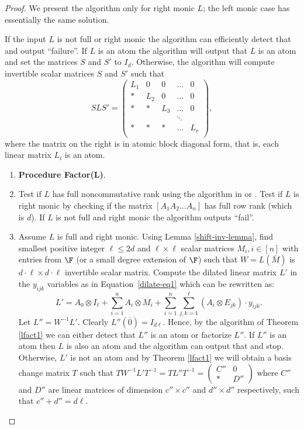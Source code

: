 \begin{proof}
  We present the algorithm only for right monic $L$; the left monic
  case has essentially the same solution.

  If the input $L$ is not full or right monic the algorithm can
  efficiently detect that and output ``failure''. If $L$ is an atom
  the algorithm will output that $L$ is an atom and set the matrices
  $S$ and $S'$ to $I_d$. Otherwise, the algorithm will compute
  invertible scalar matrices $S$ and $S'$ such that
\begin{equation}\label{eq-block-atom}
S L S' = 
\left(
\begin{array}{ccccc}
L_1 & 0 &0 &\ldots & 0\\
* & L_2 &0 &\ldots & 0\\
* & * &L_3 &\ldots & 0\\
& & &\ddots &\\
* & * &* &\ldots & L_r\\
\end{array}
\right),
\end{equation}
where the matrix on the right is in atomic block diagonal form, that
is, each linear matrix $L_i$ is an atom.

\begin{enumerate}
\item[]   {\bf Procedure Factor(L)}.
\item Test if $L$ has full noncommutative rank using the algorithm in
  \cite{IQS17} or \cite{GGOW20}. Test if $L$ is right monic by checking if
  the matrix $[A_1 A_2 \ldots A_n]$ has full row rank (which is $d$).
  If $L$ is not full and right monic the algorithm outputs ``fail''.
\item Assume $L$ is full and right monic. Using Lemma
  \ref{shift-inv-lemma}, find smallest positive integer $\ell \leq 2d$
  and $\ell\times \ell$ scalar matrices $M_i, i\in [n]$ with entries
  from $\F$ (or a small degree extension of $\F$) such that
  $W=L(\bar{M})$ is $d \cdot \ell \times d \cdot \ell$ invertible
  scalar matrix. Compute the dilated linear matrix $L'$ in the
  $y_{ijk}$ variables as in Equation~\ref{dilate-eq1} which can be
  rewritten as:
\[
L' = A_0\otimes I_\ell + \sum_{i=1}^n A_i\otimes M_i +
\sum_{i=1}^n\sum_{j,k=1}^\ell (A_i\otimes E_{jk})\cdot y_{ijk}.
\]
Let $L''= W^{-1} L'$. Clearly $L''(\overline{0})= I_{d\ell}$. Hence,
by the algorithm of Theorem \ref{lfact1} we can either detect that
$L''$ is an atom or factorize $L''$. If $L''$ is an atom then $L$ is
also an atom and the algorithm can output that and stop.  Otherwise,
$L'$ is not an atom and by Theorem \ref{lfact1} we will obtain a basis  
change matrix $T$ such that $T W^{-1} L' T^{-1}= T L'' T^{-1} = \left(
\begin{array}{cc}
C'' & 0 \\
* & D''
\end{array}
\right)$ where $C''$ and $D''$ are linear matrices of dimension $c''
\times c''$ and $d'' \times d''$ respectively, such that $c''+ d'' = d
\ell$.


\end{enumerate}
\end{proof}
